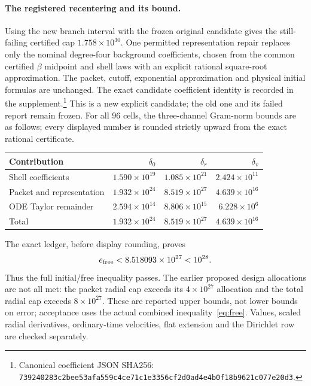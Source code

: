 \paragraph{The registered recentering and its bound.}
Using the new branch interval with the frozen original candidate gives the
still-failing certified cap $1.758\times10^{30}$. One permitted representation
repair replaces only the nominal degree-four background coefficients, chosen
from the common certified $\beta$ midpoint and shell laws with an explicit
rational square-root approximation. The packet, cutoff, exponential
approximation and physical initial formulas are unchanged. The exact candidate
coefficient identity is recorded in the supplement.\footnote{Canonical
coefficient JSON SHA256:
\texttt{739240283c2bee53afa559c4ce71c1e3}\allowbreak\texttt{356cf2d0ad4e4b0f18b9621c077e20d3}.}
This is a new explicit candidate; the old one and its failed report remain frozen.
For all 96 cells, the three-channel Gram-norm bounds are as follows; every
displayed number is rounded strictly upward from the exact rational certificate.
\begin{center}\small
\begin{tabular}{@{}lrrr@{}}
\toprule
Contribution & $\delta_0$ & $\delta_r$ & $\delta_v$ \\
\midrule
Shell coefficients & $1.590\times10^{19}$ & $1.085\times10^{21}$ & $2.424\times10^{11}$ \\
Packet and representation & $1.932\times10^{24}$ & $8.519\times10^{27}$ & $4.639\times10^{16}$ \\
ODE Taylor remainder & $2.594\times10^{14}$ & $8.806\times10^{15}$ & $6.228\times10^{6}$ \\
Total & $1.932\times10^{24}$ & $8.519\times10^{27}$ & $4.639\times10^{16}$ \\
\bottomrule
\end{tabular}
\end{center}
The exact ledger, before display rounding, proves
\begin{equation}
 e_{\rm free}<8.518093\times10^{27}<10^{28}.\label{eq:passed}
\end{equation}
Thus the full initial/free inequality passes. The earlier proposed design
allocations are not all met: the packet radial cap exceeds its $4\times10^{27}$
allocation and the total radial cap exceeds $8\times10^{27}$. These are reported
upper bounds, not lower bounds on error; acceptance uses the actual combined
inequality~\eqref{eq:free}. Values, scaled radial derivatives, ordinary-time
velocities, flat extension and the Dirichlet row are checked separately.

